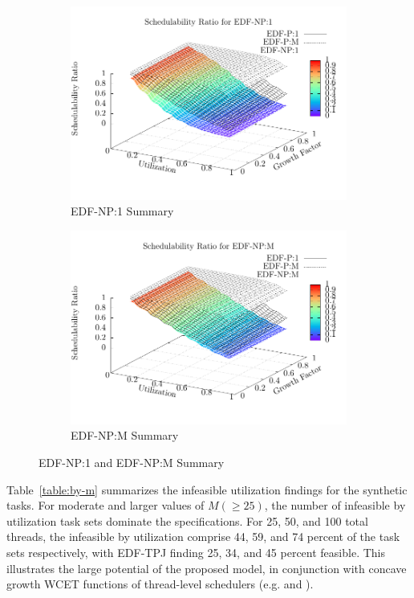 \begin{figure}[ht]
  \centering
  \begin{subfigure}{\cwidth}
    \includegraphics[width=\linewidth]{plot/avg-alg-sched/avg-ratio-NP-1}
    \caption{EDF-NP:1 Summary}
    \label{fig:avg-ratio-NP-1}
  \end{subfigure}%
  \begin{subfigure}{\cwidth}
    \includegraphics[width=\linewidth]{plot/avg-alg-sched/avg-ratio-NP-m}
    \caption{EDF-NP:M Summary}
  \label{fig:avg-ratio-NP-m}
  \end{subfigure}
  \caption{EDF-NP:1 and EDF-NP:M Summary}
\end{figure}



Table~\ref{table:by-m} summarizes the infeasible utilization
findings for the synthetic tasks. For moderate and larger values of
${M (\ge 25)}$, the number of infeasible by utilization task sets
dominate the specifications. For 25, 50, and 100 total threads, the
infeasible by utilization comprise 44, 59, and 74 percent of the task
sets respectively, with EDF-TPJ finding 25, 34, and 45 percent 
feasible. This illustrates the large potential of the proposed model,
in conjunction with concave growth WCET functions of
thread-level schedulers (e.g. \bundle{} and \bundlep{}).


